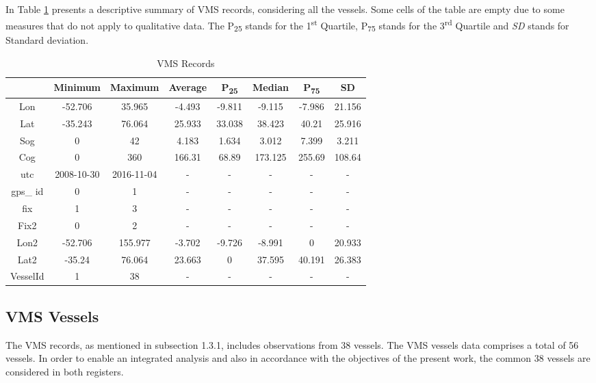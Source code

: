 In Table \ref{table:vms_records_table} presents a descriptive summary of VMS records, considering all the vessels.
Some cells of the table are empty due to some measures that do not apply to qualitative data.
The P\textsubscript{25} stands for the 1\textsuperscript{st} Quartile, P\textsubscript{75} stands for the 3\textsuperscript{rd} Quartile and \textit{SD} stands for Standard deviation.

\begin {table}[H]
\small
\caption {VMS Records}
\begin{center}
\begin{tabular}{c|c|c|c|c|c|c|c}
& Minimum & Maximum & Average & P\textsubscript{25} & Median & P\textsubscript{75} & SD\\
\hline
Lon & -52.706 & 35.965 & -4.493 &-9.811&-9.115&-7.986&21.156\\
Lat & -35.243 &76.064&25.933&33.038&38.423&40.21&25.916\\
Sog & 0 &42&4.183&1.634&3.012&7.399&3.211\\
Cog & 0&360&166.31&68.89&173.125&255.69&108.64\\
utc & 2008-10-30 & 2016-11-04 &-&-&-&-&-\\
gps\_ id & 0&1&-&-&-&-&-\\
fix & 1&3&-&-&-&-&-\\
Fix2 & 0&2&-&-&-&-&-\\
Lon2 & -52.706&155.977&-3.702&-9.726&-8.991&0&20.933\\
Lat2 & -35.24&76.064&23.663&0&37.595&40.191&26.383\\
VesselId & 1&38&-&-&-&-&-
\label{table:vms_records_table}
\end{tabular}
\end{center}
\end {table}



\subsection{VMS Vessels} %
\label{sub:vms_vessels}

The VMS records, as mentioned in subsection 1.3.1,  includes observations from 38 vessels. The VMS vessels data comprises a total of 56 vessels. In order to enable an integrated analysis and also in accordance with the objectives of the present work, the common 38 vessels are considered in both registers.

